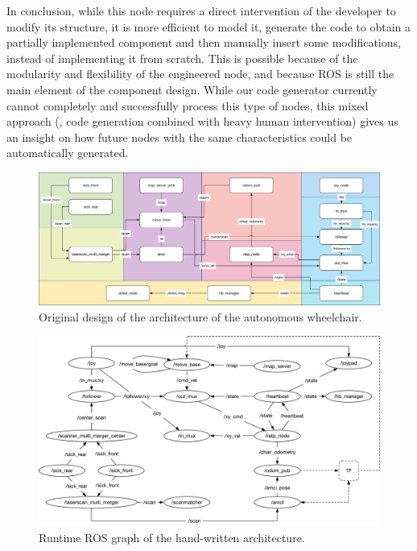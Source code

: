 In conclusion, while this node requires a direct intervention of the developer to modify its structure, it is more efficient to model it, generate the code to obtain a partially implemented component and then manually insert some modifications, instead of implementing it from scratch. This is possible because of the modularity and flexibility of the engineered node, and because ROS is still the main element of the component design. While our code generator currently cannot completely and successfully process this type of nodes, this mixed approach (\ie, code generation combined with heavy human intervention) gives us an insight on how future nodes with the same characteristics could be automatically generated.


\begin{landscape}
	\begin{figure}[t]
	\centering
	\includegraphics[width=0.95\textheight]{gfx/pmk/softwarearchitecture}
	\caption{Original design of the architecture of the autonomous wheelchair.}
	\label{fig:pmk-doc}
	\end{figure}
\end{landscape}

\begin{landscape}
	\begin{figure}[t]
	\centering
	\includegraphics[width=0.95\textheight]{gfx/pmk/hand-graph}
	\caption{Runtime ROS graph of the hand-written architecture.}
	\label{fig:pmk-graph}
	\end{figure}
\end{landscape}

